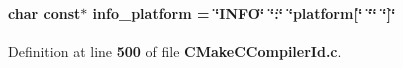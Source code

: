 \paragraph[{info\+\_\+platform}]{\setlength{\rightskip}{0pt plus 5cm}char const$\ast$ info\+\_\+platform = \char`\"{}I\+N\+FO\char`\"{} \char`\"{}\+:\char`\"{} \char`\"{}platform[\char`\"{} \char`\"{}\char`\"{} \char`\"{}]\char`\"{}}\label{gr-radar-dev_2build_2CMakeFiles_23_85_81_2CompilerIdC_2CMakeCCompilerId_8c_a2321403dee54ee23f0c2fa849c60f7d4}


Definition at line {\bf 500} of file {\bf C\+Make\+C\+Compiler\+Id.\+c}.

